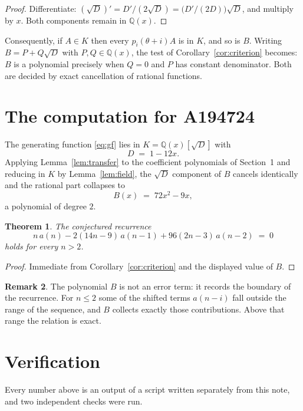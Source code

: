 \documentclass[11pt,a4paper]{article}
\theoremstyle{plain}
\newtheorem{theorem}{Theorem}
\theoremstyle{definition}
\newtheorem{remark}[theorem]{Remark}
\begin{document}
\begin{proof}
Differentiate: $(\sqrt{D})'=D'/(2\sqrt{D})=\bigl(D'/(2D)\bigr)\sqrt{D}$, and multiply by
$x$. Both components remain in $\mathbb{Q}(x)$.
\end{proof}

Consequently, if $A\in K$ then every $p_{i}(\theta+i)A$ is in $K$, and so is $B$. Writing
$B=P+Q\sqrt{D}$ with $P,Q\in\mathbb{Q}(x)$, the test of Corollary~\ref{cor:criterion}
becomes: $B$ is a polynomial precisely when $Q=0$ and $P$ has constant denominator. Both
are decided by exact cancellation of rational functions.

\section{The computation for A194724}

The generating function \eqref{eq:gf} lies in $K=\mathbb{Q}(x)[\sqrt{D}]$ with
\[
D \;=\; 1 - 12 x .
\]
Applying Lemma~\ref{lem:transfer} to the coefficient polynomials of Section~1 and reducing
in $K$ by Lemma~\ref{lem:field}, the $\sqrt{D}$ component of $B$ cancels identically and
the rational part collapses to
\[
B(x)\;=\;72 x^{2} - 9 x ,
\]
a polynomial of degree $2$.

\begin{theorem}
The conjectured recurrence
\[
n\,a(n) -  2 \left(14 n - 9\right)\,a(n-1) + 96 \left(2 n - 3\right)\,a(n-2) \;=\;0
\]
holds for every $n>2$.
\end{theorem}

\begin{proof}
Immediate from Corollary~\ref{cor:criterion} and the displayed value of $B$.
\end{proof}

\begin{remark}
The polynomial $B$ is not an error term: it records the boundary of the recurrence. For
$n\le2$ some of the shifted terms $a(n-i)$ fall outside the range of the sequence,
and $B$ collects exactly those contributions. Above that range the relation is exact.
\end{remark}

\section{Verification}

Every number above is an output of a script written separately from this note, and two
independent checks were run.
\end{document}
